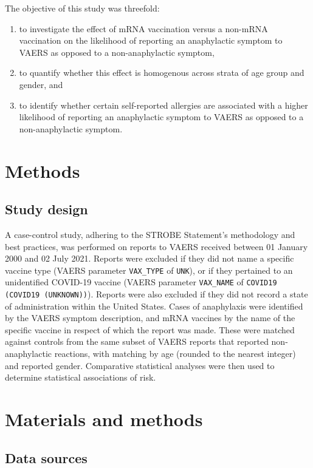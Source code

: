 \documentclass{article}
\begin{document}
The objective of this study was threefold:

\begin{enumerate}
    \item to investigate the effect of mRNA vaccination versus a non-mRNA vaccination on the likelihood of reporting an anaphylactic symptom to VAERS as opposed to a non-anaphylactic symptom,
    \item to quantify whether this effect is homogenous across strata of age group and gender, and
    \item to identify whether certain self-reported allergies are associated with a higher likelihood of reporting an anaphylactic symptom to VAERS as opposed to a non-anaphylactic symptom.
\end{enumerate}

\section{Methods}

\subsection{Study design}

A case-control study, adhering to the STROBE Statement's methodology and best practices,\cite{von2014strengthening} was performed on reports to VAERS received between 01 January 2000 and 02 July 2021.
Reports were excluded if they did not name a specific vaccine type (VAERS parameter \texttt{VAX\_TYPE} of \texttt{UNK}), or if they pertained to an unidentified COVID-19 vaccine (VAERS parameter \texttt{VAX\_NAME} of \texttt{COVID19 (COVID19 (UNKNOWN))}).
Reports were also excluded if they did not record a state of administration within the United States.
Cases of anaphylaxis were identified by the VAERS symptom description, and mRNA vaccines by the name of the specific vaccine in respect of which the report was made.
These were matched against controls from the same subset of VAERS reports that reported non-anaphylactic reactions, with matching by age (rounded to the nearest integer) and reported gender.
Comparative statistical analyses were then used to determine statistical associations of risk.

\section{Materials and methods}

\subsection{Data sources}
\end{document}
